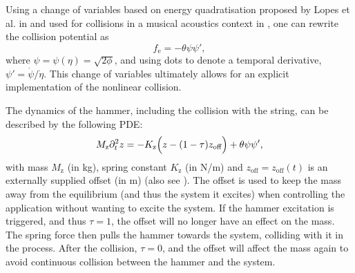 \documentclass{article}
\begin{document}
Using a change of variables based on energy quadratisation proposed by Lopes et al. in \cite{Lopes2015} and used for collisions in a musical acoustics context in \cite{Ducceschi2021}, one can rewrite the collision potential as
\begin{equation}
    f_\text{e} = -\theta\psi \psi',
\end{equation}
where $\psi = \psi(\eta) = \sqrt{2\phi}$, and using dots to denote a temporal derivative, $\psi' = \dot \psi / \dot \eta$. This change of variables ultimately allows for an explicit implementation of the nonlinear collision. 

The dynamics of the hammer, including the collision with the string, can be described by the following PDE:
\begin{equation}\label{eq:massSpring}
    M_\text{z}\partial_t^2 z = -K_\text{z} \Big(z - (1-\tau)z_\text{off}\Big) + \theta \psi\psi',
\end{equation}
with mass $M_\text{z}$ (in kg), spring constant $K_\text{z}$ (in N/m) and $z_\text{off} = z_\text{off}(t)$ is an externally supplied offset (in m) (also see \cite{Willemsen2020}). The offset is used to keep the mass away from the equilibrium (and thus the system it excites) when controlling the application without wanting to excite the system. If the hammer excitation is triggered, and thus $\tau = 1$, the offset will no longer have an effect on the mass. The spring force then pulls the hammer towards the system, colliding with it in the process. After the collision, $\tau = 0$, and the offset will affect the mass again to avoid continuous collision between the hammer and the system. 
\end{document}
